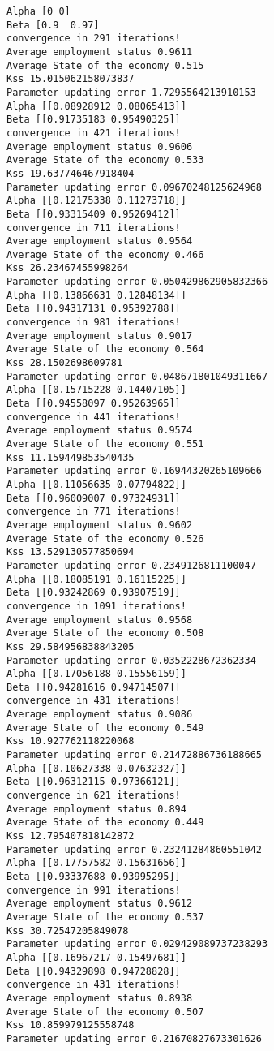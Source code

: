 \documentclass[11pt]{article}
\begin{document}
    \begin{Verbatim}[commandchars=\\\{\}]
Alpha [0 0]
Beta [0.9  0.97]
convergence in 291 iterations!
Average employment status 0.9611
Average State of the economy 0.515
Kss 15.015062158073837
Parameter updating error 1.7295564213910153
Alpha [[0.08928912 0.08065413]]
Beta [[0.91735183 0.95490325]]
convergence in 421 iterations!
Average employment status 0.9606
Average State of the economy 0.533
Kss 19.637746467918404
Parameter updating error 0.09670248125624968
Alpha [[0.12175338 0.11273718]]
Beta [[0.93315409 0.95269412]]
convergence in 711 iterations!
Average employment status 0.9564
Average State of the economy 0.466
Kss 26.23467455998264
Parameter updating error 0.050429862905832366
Alpha [[0.13866631 0.12848134]]
Beta [[0.94317131 0.95392788]]
convergence in 981 iterations!
Average employment status 0.9017
Average State of the economy 0.564
Kss 28.1502698609781
Parameter updating error 0.048671801049311667
Alpha [[0.15715228 0.14407105]]
Beta [[0.94558097 0.95263965]]
convergence in 441 iterations!
Average employment status 0.9574
Average State of the economy 0.551
Kss 11.159449853540435
Parameter updating error 0.16944320265109666
Alpha [[0.11056635 0.07794822]]
Beta [[0.96009007 0.97324931]]
convergence in 771 iterations!
Average employment status 0.9602
Average State of the economy 0.526
Kss 13.529130577850694
Parameter updating error 0.2349126811100047
Alpha [[0.18085191 0.16115225]]
Beta [[0.93242869 0.93907519]]
convergence in 1091 iterations!
Average employment status 0.9568
Average State of the economy 0.508
Kss 29.584956838843205
Parameter updating error 0.0352228672362334
Alpha [[0.17056188 0.15556159]]
Beta [[0.94281616 0.94714507]]
convergence in 431 iterations!
Average employment status 0.9086
Average State of the economy 0.549
Kss 10.927762118220068
Parameter updating error 0.21472886736188665
Alpha [[0.10627338 0.07632327]]
Beta [[0.96312115 0.97366121]]
convergence in 621 iterations!
Average employment status 0.894
Average State of the economy 0.449
Kss 12.795407818142872
Parameter updating error 0.23241284860551042
Alpha [[0.17757582 0.15631656]]
Beta [[0.93337688 0.93995295]]
convergence in 991 iterations!
Average employment status 0.9612
Average State of the economy 0.537
Kss 30.72547205849078
Parameter updating error 0.029429089737238293
Alpha [[0.16967217 0.15497681]]
Beta [[0.94329898 0.94728828]]
convergence in 431 iterations!
Average employment status 0.8938
Average State of the economy 0.507
Kss 10.859979125558748
Parameter updating error 0.21670827673301626

\end{Verbatim}
\end{document}
